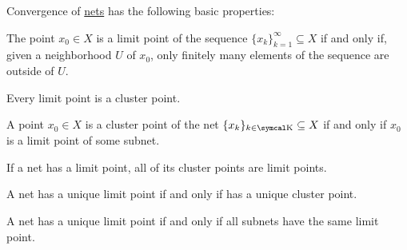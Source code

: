\begin{Proposition}\label{thm:net_convergence_properties}
  Convergence of \hyperref[def:net_convergence]{nets} has the following basic properties:

  \begin{PropEnum}
     The point \( x_0 \in X \) is a limit point of the sequence \( \{ x_k \}_{k=1}^\infty \subseteq X \) if and only if, given a neighborhood \( U \) of \( x_0 \), only finitely many elements of the sequence are outside of \( U \).

     Every limit point is a cluster point.

     A point \( x_0 \in X \) is a cluster point of the net \( \{ x_k \}_{k \in \CK} \subseteq X \) if and only if \( x_0 \) is a limit point of some subnet.

     If a net has a limit point, all of its cluster points are limit points.

     A net has a unique limit point if and only if has a unique cluster point.

     A net has a unique limit point if and only if all subnets have the same limit point.
  \end{PropEnum}
\end{Proposition}

